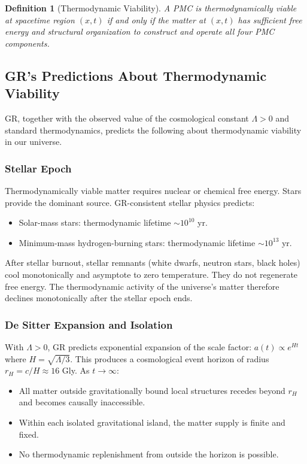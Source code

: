 \documentclass[11pt,a4paper]{article}
\newtheorem{definition}{Definition}
\begin{document}
\begin{definition}[Thermodynamic Viability]
A PMC is \emph{thermodynamically viable} at spacetime region $(x,t)$ if and only if
the matter at $(x,t)$ has sufficient free energy and structural organization to
construct and operate all four PMC components.
\end{definition}

\subsection{GR's Predictions About Thermodynamic Viability}

GR, together with the observed value of the cosmological constant $\Lambda > 0$ and
standard thermodynamics, predicts the following about thermodynamic viability in our
universe.

\subsubsection{Stellar Epoch}

Thermodynamically viable matter requires nuclear or chemical free energy. Stars provide
the dominant source. GR-consistent stellar physics predicts:

\begin{itemize}
\item Solar-mass stars: thermodynamic lifetime $\sim 10^{10}$ yr.
\item Minimum-mass hydrogen-burning stars: thermodynamic lifetime $\sim 10^{13}$ yr.
\end{itemize}

After stellar burnout, stellar remnants (white dwarfs, neutron stars, black holes)
cool monotonically and asymptote to zero temperature. They do not regenerate free
energy. The thermodynamic activity of the universe's matter therefore declines
monotonically after the stellar epoch ends.

\subsubsection{De Sitter Expansion and Isolation}

With $\Lambda > 0$, GR predicts exponential expansion of the scale factor:
$a(t) \propto e^{Ht}$ where $H = \sqrt{\Lambda/3}$. This produces a cosmological
event horizon of radius $r_H = c/H \approx 16$ Gly. As $t \to \infty$:

\begin{itemize}
\item All matter outside gravitationally bound local structures recedes beyond $r_H$
      and becomes causally inaccessible.
\item Within each isolated gravitational island, the matter supply is finite and
      fixed.
\item No thermodynamic replenishment from outside the horizon is possible.
\end{itemize}
\end{document}
